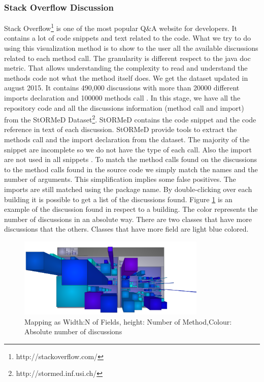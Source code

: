 \documentclass[]{usiinfbachelorproject}
\newcommand {\stormed}[0]{StORMeD\xspace}
\begin{document}
\subsubsection{Stack Overflow  Discussion}

Stack Overflow\footnote{http://stackoverflow.com/} is one of the most popular Q\&A website for developers. It contains a lot of code snippets and text related to the code. What we try to do using this visualization method is to show to the user all the available discussions related to each method call. The granularity is different respect to the java doc metric. That allows understanding the complexity to read and understand the methods code not what the method itself does. We get the dataset updated in august 2015. It contains  490,000 discussions with more than 20000 different imports declaration and 100000 methods call \cite{stormy}.
In this stage, we have all the repository code and all the discussions information (method call and import) from the \stormed  Dataset\footnote{http://stormed.inf.usi.ch/}. 
\stormed contains  the code snippet and the code reference in text of  each discussion. \stormed provide tools to extract the methods call and the import declaration from the dataset. The  majority of the snippet are incomplete so we do not have the type of each call. Also the import are not used in all snippets \cite{stormy}. To match the method calls found on the discussions to the method calls found in the source code we simply match the names and the number of arguments. This simplification implies some false positives. The imports are still matched using the package name.
By double-clicking over each building it is possible to get a list of the discussions found.
Figure \ref{fig:disc} is an example of the discussion found in respect to a building. The color represents the number of discussions in an absolute way. There are two classes that have more discussions that the others. Classes that have more field are light blue colored.


\begin{figure}[H]
	\centering
	\includegraphics[width=0.8\textwidth]{images/discAbsLang}
	
	\caption[Discussion Mapping]{Mapping as Width:N of Fields, height: Number of Method,Colour: Absolute number of discussions\label{fig:disc}}

\end{figure}
\end{document}
